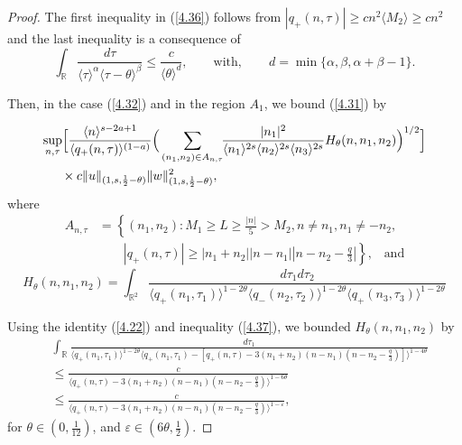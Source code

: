 \documentclass[reqno]{amsart}
\numberwithin{equation}{section}
\begin{document}
\begin{proof}
The first inequality in (\ref{4.36}) follows from $|
q_{+}(n,\tau)| \geq cn^{2}\langle M_{2}\rangle\geq cn^{2}$ and the
last inequality is a consequence of
\begin{equation}\label{4.37}
\int_{\mathbb{R}}\frac{d\tau}{\langle\tau\rangle^{\alpha}\langle\tau
-\theta\rangle^{\beta}}\leq\frac{c}{\langle\theta\rangle^{d}},
\qquad \text{with}, \qquad d= \min \{\alpha, \beta, \alpha+ \beta
-1\}.
\end{equation}

Then, in the case (\ref{4.32}) and in the region $A_{1}$, we bound (\ref{4.31}) by

\begin{equation}\label{4.35}
\begin{split}
&\underset{n,\tau}{\sup}\Big[ \frac{\langle n\rangle^{s-2a+1}}{\langle q_{+}(n,\tau)\rangle^{(1-a)}}
\Big(\sum\limits_{(n_{1},n_{2})\in A_{n,\tau}}\!\!\frac{|n_1| ^{2}}{\langle n_{1}\rangle ^{2s}
\langle n_{2}\rangle^{2s}\langle n_3\rangle^{2s}} H_{\theta}(n,n_{1},n_{2})\Big) ^{1/2}
\Big]\\
& \hspace{0.5cm} \times c\| u\| _{(1,s,\frac12-\theta)}\| w\| _{(1,s,\frac12-\theta)}^{2}\text{,}
\end{split}
\end{equation}
where
\begin{equation*}
\begin{split}
A_{n,\tau} &  =\left\{  \left(  n_{1},n_{2}\right)  :M_{1}\geq L\geq \frac{| n| }{5}>M_{2},n\neq
n_{1},n_{1}\neq-n_{2},\right.
\\
& \qquad \left.  | q_{+}(n,\tau)| \geq | n_1+n_2| | n-n_{1}| | n-n_{2}-\frac{q}{3}| \right\},
\; \; \; \text{and}
\end{split}
\end{equation*}
\[
H_{\theta}(n,n_{1},n_{2})=\int_{\mathbb{R}^{2}}\frac{d\tau_{1}d\tau_{2}}{\langle q_{+}(n_{1},\tau_{1})\rangle^{1-2\theta}\langle
q_{-}(n_{2},\tau _{2})\rangle^{1-2\theta}\langle
q_{+}(n_3,\tau_3)\rangle^{1-2\theta}}
\]

Using the identity (\ref{4.22}) and inequality (\ref{4.37}), we bounded $H_{\theta}(n,n_{1},n_{2})$ by
\begin{equation}\label{4.38}
\begin{split}
& \int_{\mathbb{R}}\frac{d\tau_{1}}{\langle q_{+}(n_1,\tau_1)\rangle^{1\!-\!2\theta}\langle q_{+}
(n_{1},\tau_{1})\!-\![q_{+}(n,\tau)\!-\!3(  n_1\!+\!n_2)(n\!-\!n_1)( n\!-\!n_2\!-\!\frac{q}{3})]
\rangle^{1\!-\!4\theta}}\\
&  \leq\frac{c}{\langle q_{+}(n,\tau)-3( n_1+n_2)(n-n_1)(  n-n_2-\frac{q}{3})  \rangle^{1-6\theta}}\\
&  \leq\frac{c}{\langle q_{+}(n,\tau)-3\left(  n_{1}+n_{2}\right)
\left(n-n_{1}\right)  \left(  n-n_{2}-\frac{q}{3}\right)  \rangle^{1-\varepsilon}},
\end{split}
\end{equation}
for $\theta\in\left(  0,\frac{1}{12}\right)  $, and
$\varepsilon\in\left( 6\theta,\frac{1}{2}\right)$.
\vspace{0,5cm}


\end{proof}
\end{document}

